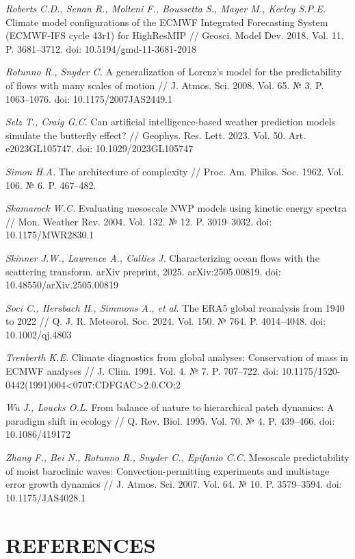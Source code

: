 \documentclass[12pt,a4paper]{article}
\begin{document}
\noindent \textit{Roberts C.D., Senan R., Molteni F., Boussetta S., Mayer M., Keeley S.P.E.} Climate model configurations of the ECMWF Integrated Forecasting System (ECMWF-IFS cycle 43r1) for HighResMIP // Geosci. Model Dev. 2018. Vol. 11. P. 3681–3712. doi: 10.5194/gmd-11-3681-2018

\noindent \textit{Rotunno R., Snyder C.} A generalization of Lorenz's model for the predictability of flows with many scales of motion // J. Atmos. Sci. 2008. Vol. 65. № 3. P. 1063–1076. doi: 10.1175/2007JAS2449.1

\noindent \textit{Selz T., Craig G.C.} Can artificial intelligence-based weather prediction models simulate the butterfly effect? // Geophys. Res. Lett. 2023. Vol. 50. Art. e2023GL105747. doi: 10.1029/2023GL105747

\noindent \textit{Simon H.A.} The architecture of complexity // Proc. Am. Philos. Soc. 1962. Vol. 106. № 6. P. 467–482.

\noindent \textit{Skamarock W.C.} Evaluating mesoscale NWP models using kinetic energy spectra // Mon. Weather Rev. 2004. Vol. 132. № 12. P. 3019–3032. doi: 10.1175/MWR2830.1

\noindent \textit{Skinner J.W., Lawrence A., Callies J.} Characterizing ocean flows with the scattering transform. arXiv preprint, 2025. arXiv:2505.00819. doi: 10.48550/arXiv.2505.00819

\noindent \textit{Soci C., Hersbach H., Simmons A., et al.} The ERA5 global reanalysis from 1940 to 2022 // Q. J. R. Meteorol. Soc. 2024. Vol. 150. № 764. P. 4014–4048. doi: 10.1002/qj.4803

\noindent \textit{Trenberth K.E.} Climate diagnostics from global analyses: Conservation of mass in ECMWF analyses // J. Clim. 1991. Vol. 4. № 7. P. 707–722. doi: 10.1175/1520-0442(1991)004<0707:CDFGAC>2.0.CO;2

\noindent \textit{Wu J., Loucks O.L.} From balance of nature to hierarchical patch dynamics: A paradigm shift in ecology // Q. Rev. Biol. 1995. Vol. 70. № 4. P. 439–466. doi: 10.1086/419172

\noindent \textit{Zhang F., Bei N., Rotunno R., Snyder C., Epifanio C.C.} Mesoscale predictability of moist baroclinic waves: Convection-permitting experiments and multistage error growth dynamics // J. Atmos. Sci. 2007. Vol. 64. № 10. P. 3579–3594. doi: 10.1175/JAS4028.1

\clearpage
\section{REFERENCES}
\end{document}

